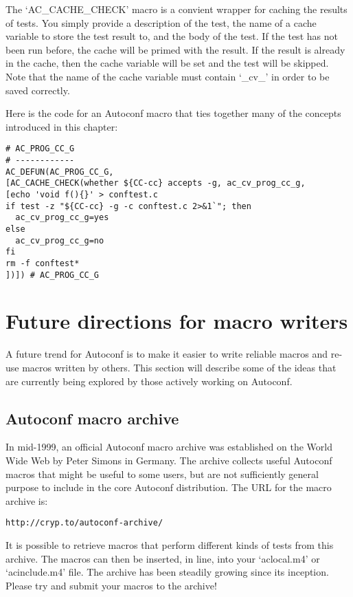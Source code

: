 The `AC\_{}CACHE\_{}CHECK' macro is a convient wrapper for caching the results of tests. You simply provide a description of the test, the name of a cache variable to store the test result to, and the body of the test. If the test has not been run before, the cache will be primed with the result. If the result is already in the cache, then the cache variable will be set and the test will be skipped. Note that the name of the cache variable must contain `\_{}cv\_{}' in order to be saved correctly.

Here is the code for an Autoconf macro that ties together many of the concepts introduced in this chapter: 

\begin{Verbatim}[frame=single]
# AC_PROG_CC_G
# ------------
AC_DEFUN(AC_PROG_CC_G,
[AC_CACHE_CHECK(whether ${CC-cc} accepts -g, ac_cv_prog_cc_g,
[echo 'void f(){}' > conftest.c
if test -z "${CC-cc} -g -c conftest.c 2>&1`"; then
  ac_cv_prog_cc_g=yes
else
  ac_cv_prog_cc_g=no
fi
rm -f conftest*
])]) # AC_PROG_CC_G
\end{Verbatim}

\section{Future directions for macro writers}

A future trend for Autoconf is to make it easier to write reliable macros 
and re-use macros written by others. This section will describe some of 
the ideas that are currently being explored by those actively working 
on Autoconf. 

\subsection{Autoconf macro archive}

In mid-1999, an official Autoconf macro archive was established on the World Wide Web by Peter Simons in Germany. The archive collects useful Autoconf macros that might be useful to some users, but are not sufficiently general purpose to include in the core Autoconf distribution. The URL for the macro archive is:
 	

\begin{Verbatim}[frame=single]
http://cryp.to/autoconf-archive/
\end{Verbatim}

It is possible to retrieve macros that perform different kinds of tests from this archive. The macros can then be inserted, in line, into your `aclocal.m4' or `acinclude.m4' file. The archive has been steadily growing since its inception. Please try and submit your macros to the archive! 

